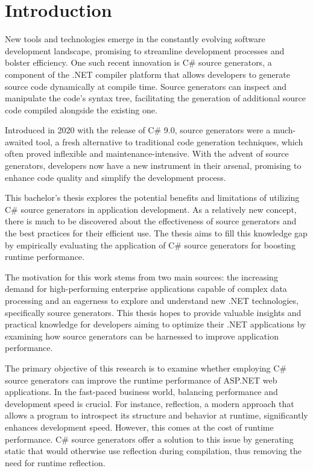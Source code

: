 \chapter{Introduction}

New tools and technologies emerge in the constantly evolving software development landscape, promising to streamline development processes and bolster efficiency. One such recent innovation is C\# source generators, a component of the .NET compiler platform that allows developers to generate source code dynamically at compile time. Source generators can inspect and manipulate the code's syntax tree, facilitating the generation of additional source code compiled alongside the existing one.

Introduced in 2020 with the release of C\# 9.0, source generators were a much-awaited tool, a fresh alternative to traditional code generation techniques, which often proved inflexible and maintenance-intensive. With the advent of source generators, developers now have a new instrument in their arsenal, promising to enhance code quality and simplify the development process.

This bachelor's thesis explores the potential benefits and limitations of utilizing C\# source generators in application development. As a relatively new concept, there is much to be discovered about the effectiveness of source generators and the best practices for their efficient use. The thesis aims to fill this knowledge gap by empirically evaluating the application of C\# source generators for boosting runtime performance.

The motivation for this work stems from two main sources: the increasing demand for high-performing enterprise applications capable of complex data processing and an eagerness to explore and understand new .NET technologies, specifically source generators. This thesis hopes to provide valuable insights and practical knowledge for developers aiming to optimize their .NET applications by examining how source generators can be harnessed to improve application performance.

The primary objective of this research is to examine whether employing C\# source generators can improve the runtime performance of ASP.NET web applications. In the fast-paced business world, balancing performance and development speed is crucial. For instance, reflection, a modern approach that allows a program to introspect its structure and behavior at runtime, significantly enhances development speed. However, this comes at the cost of runtime performance. C\# source generators offer a solution to this issue by generating static that would otherwise use reflection during compilation, thus removing the need for runtime reflection.

